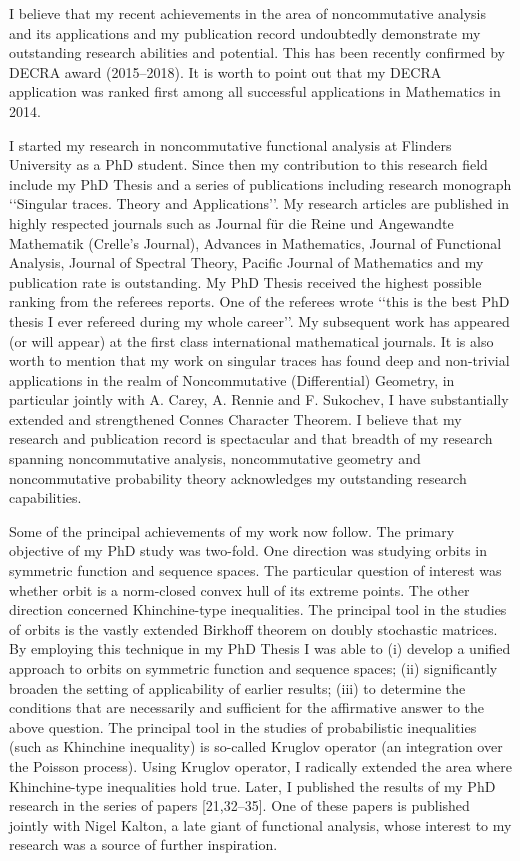 \documentclass[a4paper]{amsart}
\begin{document}
I believe that my recent achievements in the area of noncommutative analysis and its applications and my publication record undoubtedly demonstrate my outstanding research abilities and potential. This has been recently confirmed by DECRA award (2015--2018). It is worth to point out that my DECRA application was ranked first among all successful applications in Mathematics in 2014.

I started my research in noncommutative functional analysis at Flinders University as a PhD student. Since then my contribution to this research field include my PhD Thesis  and a series of publications including research monograph \lq\lq Singular traces. Theory and Applications\rq\rq. My research articles are published in highly respected journals such as Journal f\"ur die Reine und Angewandte Mathematik (Crelle's Journal), Advances in Mathematics, Journal of Functional Analysis, Journal of Spectral Theory, Pacific Journal of Mathematics and my publication rate is outstanding. My PhD Thesis received the highest possible ranking from the referees reports. One of the referees wrote \lq\lq this is the best PhD thesis I ever refereed during my whole career\rq\rq. My subsequent work has appeared (or will appear) at the first class international mathematical journals. It is also worth to mention that my work on singular traces has found deep and non-trivial applications in the realm of Noncommutative (Differential) Geometry, in particular jointly with A. Carey, A. Rennie and F. Sukochev, I have substantially extended and strengthened Connes Character Theorem. I believe that my research and publication record is spectacular and that breadth of my research spanning noncommutative analysis, noncommutative geometry and noncommutative probability theory acknowledges my outstanding research capabilities.

Some of the principal achievements of my work now follow.  The primary objective of my PhD study was two-fold. One direction was studying orbits in symmetric function and sequence spaces. The particular question of interest was whether orbit is a norm-closed convex hull of its extreme points. The other direction concerned Khinchine-type inequalities. The principal tool in the studies of orbits is the vastly extended Birkhoff theorem on doubly stochastic matrices. By employing this technique in my PhD Thesis I was able to (i) develop a unified approach to orbits on symmetric function and sequence spaces; (ii) significantly broaden the setting of applicability of earlier results; (iii) to determine the conditions that are necessarily and sufficient for the affirmative answer to the above question. The principal tool in the studies of probabilistic inequalities (such as Khinchine inequality) is so-called Kruglov operator (an integration over the Poisson process). Using Kruglov operator, I radically extended the area where Khinchine-type inequalities hold true. Later, I published the results of my PhD research in the series of papers [21,32--35]. One of these papers is published jointly with Nigel Kalton, a late giant of functional analysis, whose interest to my research was a source of further inspiration.
\end{document}
